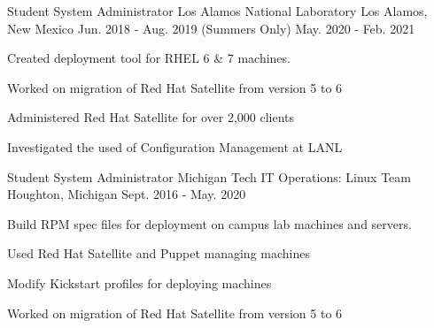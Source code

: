 \begin{cventries}
  \cventry
    {Student System Administrator} %
    {Los Alamos National Laboratory} %
    {Los Alamos, New Mexico} %
    {Jun. 2018 - Aug. 2019 (Summers Only) May. 2020 - Feb. 2021} %
    {
      \begin{cvitems} %
      \item {Created deployment tool for RHEL 6 \& 7 machines.}
        \item {Worked on migration of Red Hat Satellite from version 5 to 6}
        \item {Administered Red Hat Satellite for over 2,000 clients}
        \item {Investigated the used of Configuration Management at LANL}
      \end{cvitems}
    }

  \cventry
    {Student System Administrator} %
    {Michigan Tech IT Operations: Linux Team} %
    {Houghton, Michigan} %
    {Sept. 2016 - May. 2020} %
    {
      \begin{cvitems} %
        \item {Build RPM spec files for deployment on campus lab machines and servers.}
        \item {Used Red Hat Satellite and Puppet managing machines}
        \item {Modify Kickstart profiles for deploying machines}	
        \item {Worked on migration of Red Hat Satellite from version 5 to 6}
      \end{cvitems}
    }

\end{cventries}
